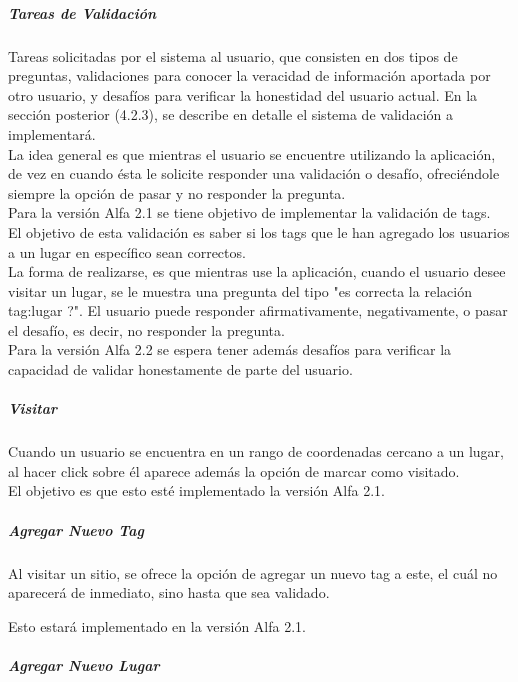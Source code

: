 \documentclass[10pt,letterpaper]{article}
\begin{document}
\subparagraph{Tareas de Validación}

Tareas solicitadas por el sistema al usuario, que consisten en dos tipos de preguntas, validaciones para conocer la veracidad de información aportada por otro usuario, y desafíos para verificar la honestidad del usuario actual. En la sección posterior (4.2.3), se describe en detalle el sistema de validación a implementará.\\

La idea general es que mientras el usuario se encuentre utilizando la aplicación, de vez en cuando ésta le solicite responder una validación o desafío, ofreciéndole siempre la opción de pasar y no responder la pregunta.\\

Para la versión Alfa 2.1 se tiene objetivo de implementar la validación de tags.\\

El objetivo de esta validación es saber si los tags que le han agregado los usuarios a un lugar en específico sean correctos.\\

La forma de realizarse, es que mientras use la aplicación, cuando el usuario desee visitar un lugar, se le muestra una pregunta del tipo "es correcta la relación tag:lugar ?". El usuario puede responder afirmativamente, negativamente, o pasar el desafío, es decir, no responder la pregunta.\\

Para la versión Alfa 2.2 se espera tener además desafíos para verificar la capacidad de validar honestamente de parte del usuario.\\

\subparagraph{Visitar}

Cuando un usuario se encuentra en un rango de coordenadas cercano a un lugar, al hacer click sobre él aparece además la opción de marcar como visitado.\\

El objetivo es que esto esté implementado la versión Alfa 2.1.\\

\subparagraph{Agregar Nuevo Tag}

Al visitar un sitio, se ofrece la opción de agregar un nuevo tag a este, el cuál no aparecerá de inmediato, sino hasta que sea validado.

Esto estará implementado en la versión Alfa 2.1.

\subparagraph{Agregar Nuevo Lugar}
\end{document}

